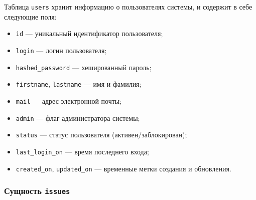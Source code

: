 Таблица \texttt{users} хранит информацию о пользователях системы, и содержит в себе следующие поля:
\begin{itemize}
    \item \texttt{id} --- уникальный идентификатор пользователя;
    \item \texttt{login} --- логин пользователя;
    \item \texttt{hashed\_password} --- хешированный пароль;
    \item \texttt{firstname}, \texttt{lastname} --- имя и фамилия;
    \item \texttt{mail} --- адрес электронной почты;
    \item \texttt{admin} --- флаг администратора системы;
    \item \texttt{status} --- статус пользователя (активен/заблокирован);
    \item \texttt{last\_login\_on} --- время последнего входа;
    \item \texttt{created\_on}, \texttt{updated\_on} --- временные метки создания и обновления.
\end{itemize}

\subsubsection{Сущность \texttt{issues}}

